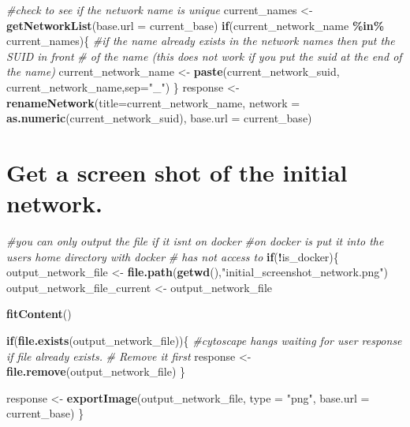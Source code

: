 \documentclass[
]{book}
\newenvironment{Shaded}{\begin{snugshade}}{\end{snugshade}}
\newcommand{\AttributeTok}[1]{\textcolor[rgb]{0.13,0.29,0.53}{#1}}
\newcommand{\CommentTok}[1]{\textcolor[rgb]{0.56,0.35,0.01}{\textit{#1}}}
\newcommand{\ControlFlowTok}[1]{\textcolor[rgb]{0.13,0.29,0.53}{\textbf{#1}}}
\newcommand{\FunctionTok}[1]{\textcolor[rgb]{0.13,0.29,0.53}{\textbf{#1}}}
\newcommand{\NormalTok}[1]{#1}
\newcommand{\OtherTok}[1]{\textcolor[rgb]{0.56,0.35,0.01}{#1}}
\newcommand{\SpecialCharTok}[1]{\textcolor[rgb]{0.81,0.36,0.00}{\textbf{#1}}}
\newcommand{\StringTok}[1]{\textcolor[rgb]{0.31,0.60,0.02}{#1}}
\begin{document}
\begin{Shaded}
\begin{Highlighting}[]
\CommentTok{\#check to see if the network name is unique}
\NormalTok{current\_names }\OtherTok{\textless{}{-}} \FunctionTok{getNetworkList}\NormalTok{(}\AttributeTok{base.url =}\NormalTok{ current\_base)}
\ControlFlowTok{if}\NormalTok{(current\_network\_name }\SpecialCharTok{\%in\%}\NormalTok{ current\_names)\{}
  \CommentTok{\#if the name already exists in the network names then put the SUID in front}
  \CommentTok{\# of the name (this does not work if you put the suid at the end of the name)}
\NormalTok{  current\_network\_name }\OtherTok{\textless{}{-}} \FunctionTok{paste}\NormalTok{(current\_network\_suid,}
\NormalTok{                                current\_network\_name,}\AttributeTok{sep=}\StringTok{"\_"}\NormalTok{)}
\NormalTok{\}}
\NormalTok{response }\OtherTok{\textless{}{-}} \FunctionTok{renameNetwork}\NormalTok{(}\AttributeTok{title=}\NormalTok{current\_network\_name, }
                       \AttributeTok{network =} \FunctionTok{as.numeric}\NormalTok{(current\_network\_suid),}
                       \AttributeTok{base.url =}\NormalTok{ current\_base)}
\end{Highlighting}
\end{Shaded}

\section{Get a screen shot of the initial network.}\label{get-a-screen-shot-of-the-initial-network.-1}

\begin{Shaded}
\begin{Highlighting}[]
\CommentTok{\#you can only output the file if it isn\textquotesingle{}t on docker}
\CommentTok{\#on docker is put it into the user\textquotesingle{}s home directory with docker }
\CommentTok{\# has not access to}
\ControlFlowTok{if}\NormalTok{(}\SpecialCharTok{!}\NormalTok{is\_docker)\{}
\NormalTok{  output\_network\_file }\OtherTok{\textless{}{-}} \FunctionTok{file.path}\NormalTok{(}\FunctionTok{getwd}\NormalTok{(),}\StringTok{"initial\_screenshot\_network.png"}\NormalTok{)}
\NormalTok{  output\_network\_file\_current }\OtherTok{\textless{}{-}}\NormalTok{ output\_network\_file}

  \FunctionTok{fitContent}\NormalTok{()}

  \ControlFlowTok{if}\NormalTok{(}\FunctionTok{file.exists}\NormalTok{(output\_network\_file))\{}
    \CommentTok{\#cytoscape hangs waiting for user response if file already exists.}
    \CommentTok{\# Remove it first}
\NormalTok{    response }\OtherTok{\textless{}{-}} \FunctionTok{file.remove}\NormalTok{(output\_network\_file)}
\NormalTok{  \} }

\NormalTok{  response }\OtherTok{\textless{}{-}} \FunctionTok{exportImage}\NormalTok{(output\_network\_file, }\AttributeTok{type =} \StringTok{"png"}\NormalTok{,}
                          \AttributeTok{base.url =}\NormalTok{ current\_base)}
\NormalTok{\}}
\end{Highlighting}
\end{Shaded}
\end{document}
